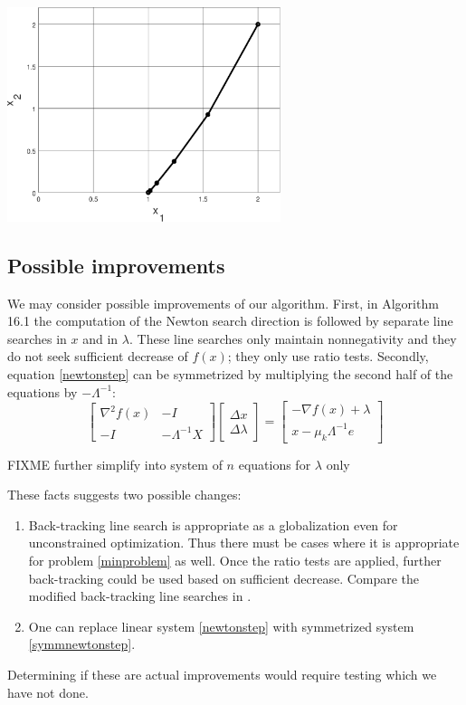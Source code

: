 \documentclass[11pt]{article}
\newcommand{\grad}{\nabla}
\begin{document}
\bigskip
\begin{center}
\includegraphics[width=0.6\textwidth]{testpopdip}
\end{center}


\subsection*{Possible improvements}

We may consider possible improvements of our algorithm.  First, in Algorithm 16.1 the computation of the Newton search direction is followed by separate line searches in $x$ and in $\lambda$.  These line searches only maintain nonnegativity and they do not seek sufficient decrease of $f(x)$; they only use ratio tests.  Secondly, equation \eqref{newtonstep} can be symmetrized by multiplying the second half of the equations by $-\Lambda^{-1}$:
\begin{equation}
\begin{bmatrix}
\grad^2 f(x) & - I \\
-I & - \Lambda^{-1} X
\end{bmatrix}
\begin{bmatrix}
\Delta x \\
\Delta \lambda
\end{bmatrix}
=
\begin{bmatrix}
-\grad f(x) + \lambda \\
x - \mu_k \Lambda^{-1} e
\end{bmatrix}
 \label{symmnewtonstep}
\end{equation}

FIXME further simplify into system of $n$ equations for $\lambda$ only

These facts suggests two possible changes:
\begin{enumerate}
\item Back-tracking line search is appropriate as a globalization even for unconstrained optimization.  Thus there must be cases where it is appropriate for problem \eqref{minproblem} as well.  Once the ratio tests are applied, further back-tracking could be used based on sufficient decrease.  Compare the modified back-tracking line searches in \cite{BensonMunson2006}.
\item One can replace linear system \eqref{newtonstep} with symmetrized system \eqref{symmnewtonstep}.
\end{enumerate}
Determining if these are actual improvements would require testing which we have not done.



\medskip



\end{document}
